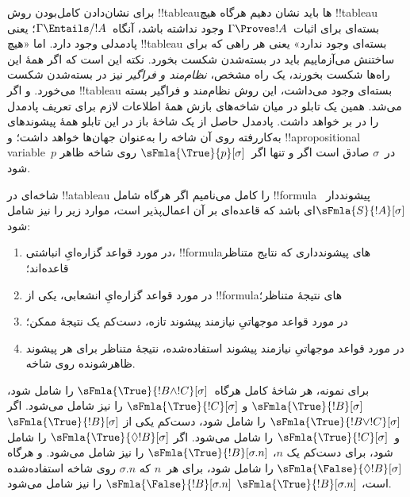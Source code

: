 \documentclass[../../../include/open-logic-section]{subfiles}
\begin{document}


\begin{explain}
  برای نشان‌دادن کامل‌بودن روش !!{tableau}ها باید نشان دهیم هرگاه هیچ
  !!{tableau} بسته‌ای برای اثبات~$\Gamma \Proves !A$ وجود نداشته
  باشد، آنگاه~$\Gamma \Entails/ !A$؛ یعنی پادمدلی وجود دارد. اما «هیچ
  !!{tableau} بسته‌ای وجود ندارد» یعنی هر راهی که برای ساختنش
  می‌آزماییم باید در بسته‌شدن شکست بخورد. نکته این است که اگر همهٔ این
  راه‌ها شکست بخورند، یک راه مشخص، \emph{نظام‌مند و فراگیر} نیز در
  بسته‌شدن شکست می‌خورد. و اگر !!{tableau} بسته‌ای وجود می‌داشت، این
  روش نظام‌مند و فراگیر بسته می‌شد. همین یک تابلو در میان شاخه‌های
  بازش همهٔ اطلاعات لازم برای تعریف پادمدل را در بر خواهد داشت. پادمدل
  حاصل از یک شاخهٔ باز در این تابلو همهٔ پیشوندهای به‌کاررفته روی آن
  شاخه را به‌عنوان جهان‌ها خواهد داشت؛ و !!a{propositional variable}~$p$
  در~$\sigma$ صادق است اگر و تنها اگر~$\sFmla{\True}{p}[\sigma]$ روی
  شاخه ظاهر شود.
\end{explain}

\begin{defn}
  شاخه‌ای در !!a{tableau} را کامل می‌نامیم اگر هرگاه شامل
  !!{formula} پیشونددار~$\sFmla{S}{!A}[\sigma]$ای باشد که قاعده‌ای بر
  آن اعمال‌پذیر است، موارد زیر را نیز شامل شود:
  \begin{enumerate}
    \item در مورد قواعد گزاره‌ایِ انباشتی، !!{formula}های پیشوندداری
      که نتایج متناظر قاعده‌اند؛
    \item در مورد قواعد گزاره‌ایِ انشعابی، یکی از !!{formula}های
      نتیجهٔ متناظر؛
    \item در مورد قواعد موجهاتیِ نیازمند پیشوند تازه، دست‌کم یک نتیجهٔ
      ممکن؛
    \item در مورد قواعد موجهاتیِ نیازمند پیشوند استفاده‌شده، نتیجهٔ
      متناظر برای هر پیشوند ظاهرشونده روی شاخه.
  \end{enumerate}
\end{defn}

\begin{explain}
برای نمونه، هر شاخهٔ کامل هرگاه~$\sFmla{\True}{!B \land
  !C}[\sigma]$ را شامل شود، $\sFmla{\True}{!B}[\sigma]$ و
$\sFmla{\True}{!C}[\sigma]$ را نیز شامل می‌شود. اگر
$\sFmla{\True}{!B \lor !C}[\sigma]$ را شامل شود، دست‌کم یکی از
$\sFmla{\True}{!B}[\sigma]$ و~$\sFmla{\True}{!C}[\sigma]$ را شامل
می‌شود. اگر 
{$\sFmla{\True}{\Diamond !B}[\sigma]$} را شامل شود، برای دست‌کم یک
$n$، 
{$\sFmla{\True}{!B}[\sigma.n]$} را نیز شامل می‌شود. و هرگاه
{$\sFmla{\False}{\Diamond !B}[\sigma]$} را شامل شود، برای هر~$n$ که
$\sigma.n$ روی شاخه استفاده‌شده است، 
{$\sFmla{\True}{!B}[\sigma.n]$}
{$\sFmla{\False}{!B}[\sigma.n]$} را نیز شامل می‌شود.
\end{explain}
\end{document}
